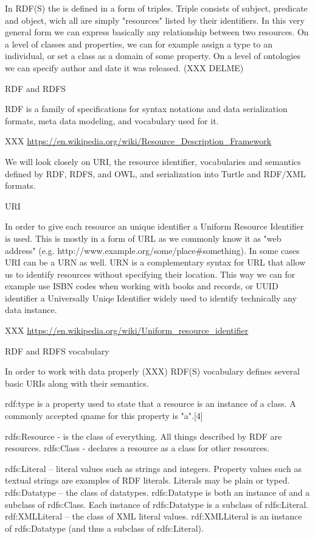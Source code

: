 In RDF(S) the  is defined in a form of triples. Triple consists of subject,
predicate and object, wich all are simply "resources" listed by their
identifiers. In this very general form we can express basically any
relationship between two resources. On a level of classes and properties, we
can for example assign a type to an individual, or set a class as a domain of
some property. On a level of ontologies we can specify author and date it was
released. (XXX DELME) 

\sec RDF and RDFS

RDF is a family of specifications for syntax notations and data serialization
formats, meta data modeling, and vocabulary used for it. 

XXX \url{https://en.wikipedia.org/wiki/Resource_Description_Framework}

We will look closely on URI, the resource identifier, vocabularies and
semantics defined by RDF, RDFS, and OWL, and serialization into Turtle and
RDF/XML formats. 

\secc URI

In order to give each resource an unique identifier a Uniform Resource
Identifier is used. This is mostly in a form of URL as we commonly know it as
"web address" (e.g. http://www.example.org/some/place\#something). In some cases
URI can be a URN as well. URN is a complementary syntax for URL that allow us
to identify resources without specifying their location. This way we can for
example use ISBN codes when working with books and records, or UUID identifier
a Universally Uniqe Identifier widely used to identify technically any data
instance. 

XXX \url{https://en.wikipedia.org/wiki/Uniform_resource_identifier}

\secc RDF and RDFS vocabulary

In order to work with data properly (XXX) RDF(S) vocabulary defines several basic URIs along with their semantics. 

    rdf:type is a property used to state that a resource is an instance of a class. A commonly accepted qname for this property is "a".[4]

    rdfs:Resource - is the class of everything. All things described by RDF are resources.
    rdfs:Class    - declares a resource as a class for other resources.

    rdfs:Literal  – literal values such as strings and integers. Property values such as textual strings are examples of RDF literals. Literals may be plain or typed.
    rdfs:Datatype – the class of datatypes. rdfs:Datatype is both an instance of and a subclass of rdfs:Class. Each instance of rdfs:Datatype is a subclass of rdfs:Literal.
    rdf:XMLLiteral – the class of XML literal values. rdf:XMLLiteral is an instance of rdfs:Datatype (and thus a subclass of rdfs:Literal).

